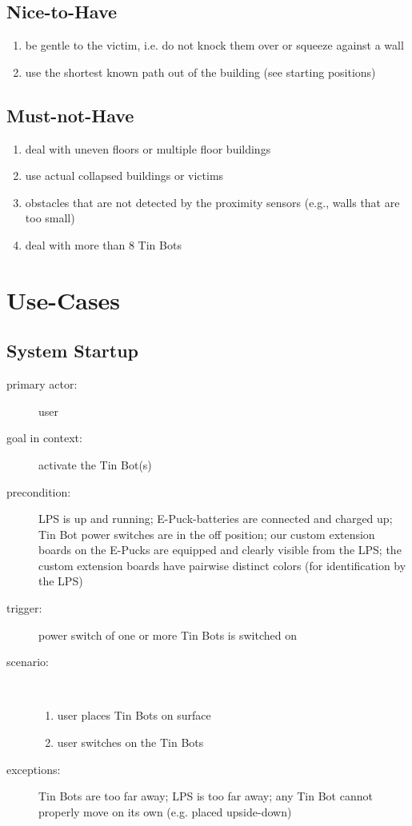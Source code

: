 \documentclass[a4paper,parskip,headheight=38pt]{scrartcl} %
\begin{document}
\subsection{Nice-to-Have}
\begin{enumerate}[label=\nicetohave]
\item be gentle to the victim, i.e. do not knock them over or squeeze against a wall
\item use the shortest known path out of the building (see starting positions)
\end{enumerate}

\subsection{Must-not-Have}
\begin{enumerate}[label=\mustnothave]
\item deal with uneven floors or multiple floor buildings
\item use actual collapsed buildings or victims
\item obstacles that are not detected by the proximity sensors (e.g., walls that are too small)
\item deal with more than 8 Tin Bots
\end{enumerate}


\section{Use-Cases}
\subsection{System Startup}
\begin{description}
\item[primary actor:] user
\item[goal in context:] activate the Tin Bot(s)
\item[precondition:] LPS is up and running; E-Puck-batteries are connected and charged up;
  Tin Bot power switches are in the off position; our custom extension boards on the
  E-Pucks %
  are equipped and clearly visible from the LPS; the custom extension boards have
  pairwise distinct colors (for identification by the LPS)
\item[trigger:] power switch of one or more Tin Bots is switched on
\item[scenario:] \ 
\begin{enumerate}
	\item user places Tin Bots on surface
	\item user switches on the Tin Bots
\end{enumerate}
\item[exceptions:] Tin Bots are too far away; LPS is too far away; any Tin Bot cannot properly move on its own (e.g. placed upside-down)
\end{description}
\end{document}
